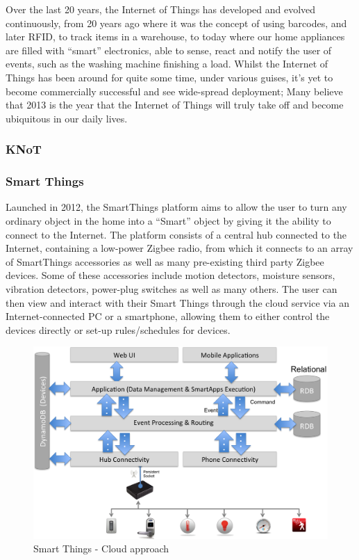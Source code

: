 Over the last 20 years, the Internet of Things has developed and evolved continuously, from 20 years ago where it was the concept of using barcodes, and later RFID\cite{K.Ashton}, to track items in a warehouse, to today where our home appliances are filled with ``smart'' electronics, able to sense, react and notify the user of events, such as the washing machine finishing a load. Whilst the Internet of Things has been around for quite some time, under various guises, it's yet to become commercially successful and see wide-spread deployment; Many believe that 2013 is the year that the Internet of Things will truly take off and become ubiquitous in our daily lives\cite{2013IoT}.

\subsubsection{KNoT} %
\label{ssub:knot}


\subsubsection{Smart Things} %
\label{ssub:smart_things}
Launched in 2012, the SmartThings platform aims to allow the user to turn any ordinary object in the home into a ``Smart'' object by giving it the ability to connect to the Internet. The platform consists of a central hub connected to the Internet, containing a low-power Zigbee radio, from which it connects to an array of SmartThings accessories as well as many pre-existing third party Zigbee devices. Some of these accessories include motion detectors, moisture sensors, vibration detectors, power-plug switches as well as many others. The user can then view and interact with their Smart Things through the cloud service via an Internet-connected PC or a smartphone, allowing them to either control the devices directly or set-up rules/schedules for devices.

\begin{figure}[h!]
\centering
    \includegraphics[scale=0.4]{images/smartThingsCloudFirstDiagram.png}
    \caption[]{Smart Things - Cloud approach\footnotemark}
    \label{fig:cloud}
\end{figure}

